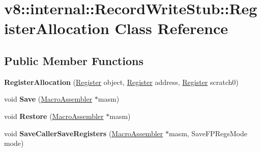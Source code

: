 \hypertarget{classv8_1_1internal_1_1_record_write_stub_1_1_register_allocation}{}\section{v8\+:\+:internal\+:\+:Record\+Write\+Stub\+:\+:Register\+Allocation Class Reference}
\label{classv8_1_1internal_1_1_record_write_stub_1_1_register_allocation}
\subsection*{Public Member Functions}
\begin{DoxyCompactItemize}
\item 
{\bfseries Register\+Allocation} (\hyperlink{structv8_1_1internal_1_1_register}{Register} object, \hyperlink{structv8_1_1internal_1_1_register}{Register} address, \hyperlink{structv8_1_1internal_1_1_register}{Register} scratch0)\hypertarget{classv8_1_1internal_1_1_record_write_stub_1_1_register_allocation_a9bd2c5bd869faf743a61ac1a0e89a8b3}{}\label{classv8_1_1internal_1_1_record_write_stub_1_1_register_allocation_a9bd2c5bd869faf743a61ac1a0e89a8b3}

\item 
void {\bfseries Save} (\hyperlink{classv8_1_1internal_1_1_macro_assembler}{Macro\+Assembler} $\ast$masm)\hypertarget{classv8_1_1internal_1_1_record_write_stub_1_1_register_allocation_a76f90ec53d09edfeb4a3de14141c921d}{}\label{classv8_1_1internal_1_1_record_write_stub_1_1_register_allocation_a76f90ec53d09edfeb4a3de14141c921d}

\item 
void {\bfseries Restore} (\hyperlink{classv8_1_1internal_1_1_macro_assembler}{Macro\+Assembler} $\ast$masm)\hypertarget{classv8_1_1internal_1_1_record_write_stub_1_1_register_allocation_a391db63ae1afc97c528cf3b5e92b9c2a}{}\label{classv8_1_1internal_1_1_record_write_stub_1_1_register_allocation_a391db63ae1afc97c528cf3b5e92b9c2a}

\item 
void {\bfseries Save\+Caller\+Save\+Registers} (\hyperlink{classv8_1_1internal_1_1_macro_assembler}{Macro\+Assembler} $\ast$masm, Save\+F\+P\+Regs\+Mode mode)\hypertarget{classv8_1_1internal_1_1_record_write_stub_1_1_register_allocation_a676d8a1bb19a5746cfc613e7374253e0}{}\label{classv8_1_1internal_1_1_record_write_stub_1_1_register_allocation_a676d8a1bb19a5746cfc613e7374253e0}


\end{DoxyCompactItemize}
